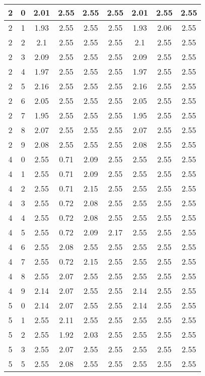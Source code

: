 \begin{longtable}{|c|c||c||c|c|c||c|c|c|}
	2 & 0 & 2.01 & 2.55 & 2.55 & 2.55 & 2.01 & 2.55 & 2.55 \\ \hline
	2 & 1 & 1.93 & 2.55 & 2.55 & 2.55 & 1.93 & 2.06 & 2.55 \\ \hline
	2 & 2 & 2.1 & 2.55 & 2.55 & 2.55 & 2.1 & 2.55 & 2.55 \\ \hline
	2 & 3 & 2.09 & 2.55 & 2.55 & 2.55 & 2.09 & 2.55 & 2.55 \\ \hline
	2 & 4 & 1.97 & 2.55 & 2.55 & 2.55 & 1.97 & 2.55 & 2.55 \\ \hline
	2 & 5 & 2.16 & 2.55 & 2.55 & 2.55 & 2.16 & 2.55 & 2.55 \\ \hline
	2 & 6 & 2.05 & 2.55 & 2.55 & 2.55 & 2.05 & 2.55 & 2.55 \\ \hline
	2 & 7 & 1.95 & 2.55 & 2.55 & 2.55 & 1.95 & 2.55 & 2.55 \\ \hline
	2 & 8 & 2.07 & 2.55 & 2.55 & 2.55 & 2.07 & 2.55 & 2.55 \\ \hline
	2 & 9 & 2.08 & 2.55 & 2.55 & 2.55 & 2.08 & 2.55 & 2.55 \\ \hline
	4 & 0 & 2.55 & 0.71 & 2.09 & 2.55 & 2.55 & 2.55 & 2.55 \\ \hline
	4 & 1 & 2.55 & 0.71 & 2.09 & 2.55 & 2.55 & 2.55 & 2.55 \\ \hline
	4 & 2 & 2.55 & 0.71 & 2.15 & 2.55 & 2.55 & 2.55 & 2.55 \\ \hline
	4 & 3 & 2.55 & 0.72 & 2.08 & 2.55 & 2.55 & 2.55 & 2.55 \\ \hline
	4 & 4 & 2.55 & 0.72 & 2.08 & 2.55 & 2.55 & 2.55 & 2.55 \\ \hline
	4 & 5 & 2.55 & 0.72 & 2.09 & 2.17 & 2.55 & 2.55 & 2.55 \\ \hline
	4 & 6 & 2.55 & 2.08 & 2.55 & 2.55 & 2.55 & 2.55 & 2.55 \\ \hline
	4 & 7 & 2.55 & 0.72 & 2.15 & 2.55 & 2.55 & 2.55 & 2.55 \\ \hline
	4 & 8 & 2.55 & 2.07 & 2.55 & 2.55 & 2.55 & 2.55 & 2.55 \\ \hline
	4 & 9 & 2.14 & 2.07 & 2.55 & 2.55 & 2.14 & 2.55 & 2.55 \\ \hline
	5 & 0 & 2.14 & 2.07 & 2.55 & 2.55 & 2.14 & 2.55 & 2.55 \\ \hline
	5 & 1 & 2.55 & 2.11 & 2.55 & 2.55 & 2.55 & 2.55 & 2.55 \\ \hline
	5 & 2 & 2.55 & 1.92 & 2.03 & 2.55 & 2.55 & 2.55 & 2.55 \\ \hline
	5 & 3 & 2.55 & 2.07 & 2.55 & 2.55 & 2.55 & 2.55 & 2.55 \\ \hline
	5 & 5 & 2.55 & 2.08 & 2.55 & 2.55 & 2.55 & 2.55 & 2.55 \\ \hline

\end{longtable}
